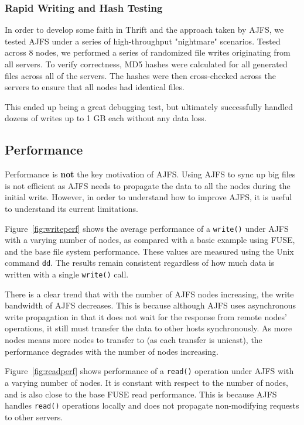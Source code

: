 \subsubsection{Rapid Writing and Hash Testing}

In order to develop some faith in Thrift and the approach taken by AJFS, we
tested AJFS under a series of high-throughput "nightmare" scenarios. Tested
across 8 nodes, we performed a series of randomized file writes originating from
all servers. To verify correctness, MD5 hashes were calculated for all generated
files across all of the servers. The hashes were then cross-checked across the
servers to ensure that all nodes had identical files.

This ended up being a great debugging test, but ultimately successfully handled
dozens of writes up to 1 GB each without any data loss.

\subsection{Performance}

Performance is \textbf{not} the key motivation of AJFS. Using AJFS to sync up
big files is not efficient as AJFS needs to propagate the data to
all the nodes during the initial write. However, in order to understand how to
improve AJFS, it is useful to understand its current limitations.

Figure~\ref{fig:writeperf} shows the average performance of a \texttt{write()}
under AJFS with a varying number of nodes, as compared with a basic example
using FUSE, and the base file system performance. These values are measured
using the Unix command \texttt{dd}. The results remain consistent regardless of
how much data is written with a single \texttt{write()} call.

There is a clear trend that with the number of AJFS nodes increasing, the write
bandwidth of AJFS decreases. This is because although AJFS uses asynchronous
write propagation in that it does not wait for the response from remote nodes'
operations, it still must transfer the data to other hosts synchronously.
As more nodes means more nodes to transfer to (as each transfer is unicast), the
performance degrades with the number of nodes increasing. 

Figure~\ref{fig:readperf} shows performance of a \texttt{read()} operation under
AJFS with a varying number of nodes. It is constant with respect to the number
of nodes, and is also close to the base FUSE read performance.
This is because AJFS handles \texttt{read()} operations locally and does not
propagate non-modifying requests to other servers.

